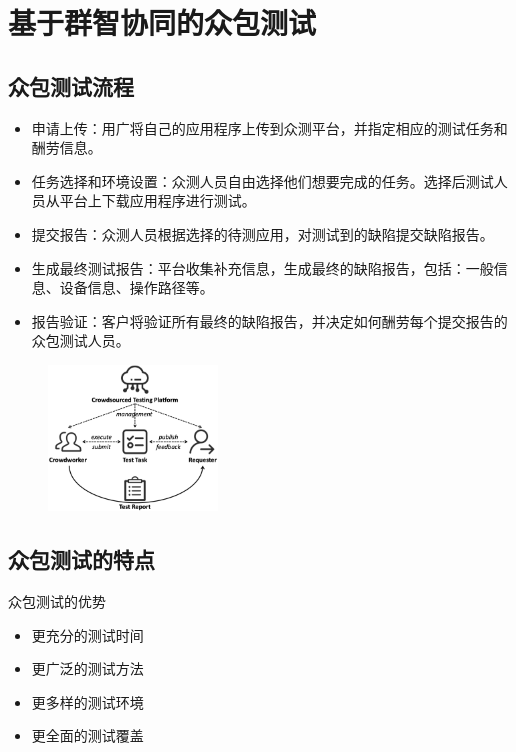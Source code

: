 \section{基于群智协同的众包测试}

\subsection{众包测试流程}
\begin{itemize}
    \item 申请上传：用广将自己的应用程序上传到众测平台，并指定相应的测试任务和酬劳信息。
    \item 任务选择和环境设置：众测人员自由选择他们想要完成的任务。选择后测试人员从平台上下载应用程序进行测试。
    \item 提交报告：众测人员根据选择的待测应用，对测试到的缺陷提交缺陷报告。
    \item 生成最终测试报告：平台收集补充信息，生成最终的缺陷报告，包括：一般信息、设备信息、操作路径等。
    \item 报告验证：客户将验证所有最终的缺陷报告，并决定如何酬劳每个提交报告的众包测试人员。
\end{itemize}

\begin{figure}[H]
    \vspace{-0.5em}
	\centering
	\includegraphics[width=0.4\textwidth]{images/众包测试流程.png}
    \vspace{-1em}
\end{figure}

\subsection{众包测试的特点}

众包测试的优势
\vspace{-0.5em}
\begin{multicols}{2}
    \begin{itemize}
        \item 更充分的测试时间
        \item 更广泛的测试方法
        \item 更多样的测试环境
        \item 更全面的测试覆盖
    \end{itemize}
\end{multicols}
\vspace{-1em}

